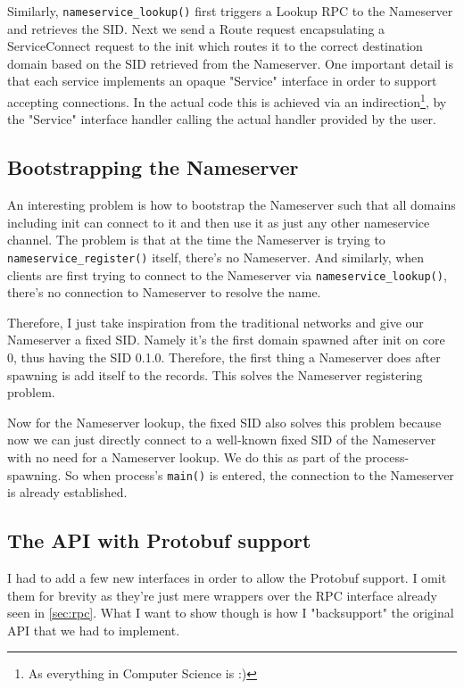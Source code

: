 Similarly, \texttt{nameservice_lookup()} first triggers a Lookup RPC to the Nameserver and retrieves the SID. Next we send a Route request encapsulating a ServiceConnect request to the init which routes it to the correct destination domain based on the SID retrieved from the Nameserver. One important detail is that each service implements an opaque "Service" interface in order to support accepting connections. In the actual code this is achieved via an indirection\footnote{As everything in Computer Science is :)}, by the "Service" interface handler calling the actual handler provided by the user.

\subsection{Bootstrapping the Nameserver}
An interesting problem is how to bootstrap the Nameserver such that all domains including init can connect to it and then use it as just any other nameservice channel. The problem is that at the time the Nameserver is trying to \texttt{nameservice_register()} itself, there's no Nameserver. And similarly, when clients are first trying to connect to the Nameserver via \texttt{nameservice_lookup()}, there's no connection to Nameserver to resolve the name.

Therefore, I just take inspiration from the traditional networks and give our Nameserver a fixed SID. Namely it's the first domain spawned after init on core 0, thus having the SID 0.1.0. Therefore, the first thing a Nameserver does after spawning is add itself to the records. This solves the Nameserver registering problem.

Now for the Nameserver lookup, the fixed SID also solves this problem because now we can just directly connect to a well-known fixed SID of the Nameserver with no need for a Nameserver lookup. We do this as part of the process-spawning. So when process's \texttt{main()} is entered, the connection to the Nameserver is already established. 

\subsection{The API with Protobuf support}
I had to add a few new interfaces in order to allow the Protobuf support. I omit them for brevity as they're just mere wrappers over the RPC interface already seen in \autoref{sec:rpc}. What I want to show though is how I "backsupport" the original API that we had to implement.

